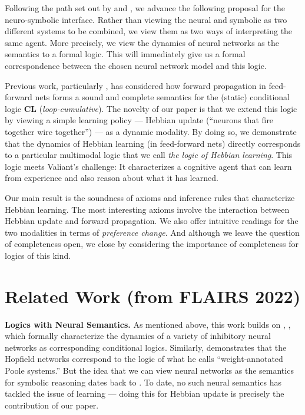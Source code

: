\documentclass[12pt]{article}
\theoremstyle{definition}
\begin{document}
Following the path set out by \cite{balkenius1991nonmonotonic} and \cite{leitgeb2001nonmonotonic,leitgeb2003nonmonotonic}, we advance the following proposal for the neuro-symbolic interface.  Rather than viewing the neural and symbolic as two different systems to be combined, we view them as two ways of interpreting the same agent.  More precisely, we view the dynamics of neural networks as the semantics to a formal logic.  This will immediately give us a formal correspondence between the chosen neural network model and this logic.

Previous work, particularly \cite{leitgeb2001nonmonotonic}, has considered how forward propagation in feed-forward nets forms a sound and complete semantics for the (static) conditional logic \textbf{CL} (\emph{loop-cumulative}).  The novelty of our paper is that we extend this logic by viewing a simple learning policy --- Hebbian update (``neurons that fire together wire together'') --- as a dynamic modality.  By doing so, we demonstrate that the dynamics of Hebbian learning (in feed-forward nets) directly corresponds to a particular multimodal logic that we call \emph{the logic of Hebbian learning}.  This logic meets Valiant's challenge:  It characterizes a cognitive agent that can learn from experience and also reason about what it has learned.

Our main result is the soundness of axioms and inference rules that characterize Hebbian learning.  The most interesting axioms involve the interaction between Hebbian update and forward propagation.  We also offer intuitive readings for the two modalities in terms of \emph{preference change}.  And although we leave the question of completeness open, we close by considering the importance of completeness for logics of this kind.

\section{\textcolor{myblue}{Related Work (from FLAIRS 2022)}}

\textbf{Logics with Neural Semantics.}
As mentioned above, this work builds on \cite{balkenius1991nonmonotonic}, \cite{leitgeb2001nonmonotonic,leitgeb2003nonmonotonic}, which formally characterize the dynamics of a variety of inhibitory neural networks as corresponding conditional logics.  Similarly, \cite{blutner2004nonmonotonic} demonstrates that the Hopfield networks correspond to the logic of what he calls ``weight-annotated Poole systems.''  But the idea that we can view neural networks as the semantics for symbolic reasoning dates back to \cite{mcculloch1943logical}.  To date, no such neural semantics has tackled the issue of learning --- doing this for Hebbian update is precisely the contribution of our paper.
\end{document}
